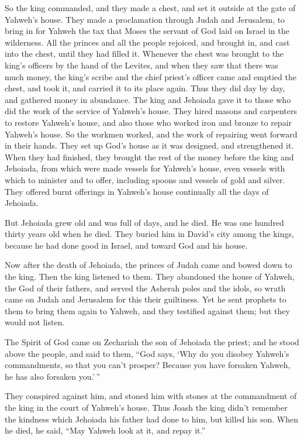  So the king commanded, and they made a chest, and set it
outside at the gate of Yahweh's house.  They made a
proclamation through Judah and Jerusalem, to bring in for Yahweh the tax
that Moses the servant of God laid on Israel in the wilderness.
 All the princes and all the people rejoiced, and brought
in, and cast into the chest, until they had filled it. 
Whenever the chest was brought to the king's officers by the hand of the
Levites, and when they saw that there was much money, the king's scribe
and the chief priest's officer came and emptied the chest, and took it,
and carried it to its place again. Thus they did day by day, and
gathered money in abundance.  The king and Jehoiada gave it
to those who did the work of the service of Yahweh's house. They hired
masons and carpenters to restore Yahweh's house, and also those who
worked iron and bronze to repair Yahweh's house.  So the
workmen worked, and the work of repairing went forward in their hands.
They set up God's house as it was designed, and strengthened it.
 When they had finished, they brought the rest of the money
before the king and Jehoiada, from which were made vessels for Yahweh's
house, even vessels with which to minister and to offer, including
spoons and vessels of gold and silver. They offered burnt offerings in
Yahweh's house continually all the days of Jehoiada.

 But Jehoiada grew old and was full of days, and he died.
He was one hundred thirty years old when he died.  They
buried him in David's city among the kings, because he had done good in
Israel, and toward God and his house.

 Now after the death of Jehoiada, the princes of Judah came
and bowed down to the king. Then the king listened to them.
 They abandoned the house of Yahweh, the God of their
fathers, and served the Asherah poles and the idols, so wrath came on
Judah and Jerusalem for this their guiltiness.  Yet he sent
prophets to them to bring them again to Yahweh, and they testified
against them; but they would not listen.

 The Spirit of God came on Zechariah the son of Jehoiada
the priest; and he stood above the people, and said to them, ``God says,
`Why do you disobey Yahweh's commandments, so that you can't prosper?
Because you have forsaken Yahweh, he has also forsaken you.'\,''

 They conspired against him, and stoned him with stones at
the commandment of the king in the court of Yahweh's house.
 Thus Joash the king didn't remember the kindness which
Jehoiada his father had done to him, but killed his son. When he died,
he said, ``May Yahweh look at it, and repay it.''

